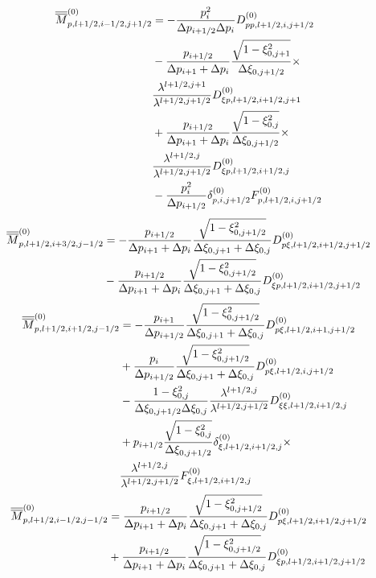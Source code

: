 \begin{align}
\overline{\overline{M}}_{p,l+1/2,i-1/2,j+1/2}^{\left( 0\right) } & =-\frac{%
p_{i}^{2}}{\Delta p_{i+1/2}\Delta p_{i}}D_{pp,l+1/2,i,j+1/2}^{\left(
0\right) }  \notag \\
& -\frac{p_{i+1/2}}{\Delta p_{i+1}+\Delta p_{i}}\frac{\sqrt{1-\xi_{0,j+1}^{2}%
}}{\Delta\xi_{0,j+1/2}}\times  \notag \\
& \frac{\lambda^{l+1/2,j+1}}{\lambda^{l+1/2,j+1/2}}D_{\xi
p,l+1/2,i+1/2,j+1}^{\left( 0\right) }  \notag \\
& +\frac{p_{i+1/2}}{\Delta p_{i+1}+\Delta p_{i}}\frac{\sqrt{1-\xi_{0,j}^{2}}%
}{\Delta\xi_{0,j+1/2}}\times  \notag \\
& \frac{\lambda^{l+1/2,j}}{\lambda^{l+1/2,j+1/2}}D_{\xi
p,l+1/2,i+1/2,j}^{\left( 0\right) }  \notag \\
& -\frac{p_{i}^{2}}{\Delta p_{i+1/2}}\delta_{p,i,j+1/2}^{\left( 0\right)
}F_{p,l+1/2,i,j+1/2}^{\left( 0\right) }
\end{align}
\begin{align}
\overline{\overline{M}}_{p,l+1/2,i+3/2,j-1/2}^{\left( 0\right) } & =-\frac{
p_{i+1/2}}{\Delta p_{i+1}+\Delta p_{i}}\frac{\sqrt{1-\xi_{0,j+1/2}^{2}}}{%
\Delta\xi_{0,j+1}+\Delta\xi_{0,j}}D_{p\xi,l+1/2,i+1/2,j+1/2}^{\left(
0\right) }  \notag \\
& -\frac{p_{i+1/2}}{\Delta p_{i+1}+\Delta p_{i}}\frac{\sqrt{1-\xi
_{0,j+1/2}^{2}}}{\Delta\xi_{0,j+1}+\Delta\xi_{0,j}}D_{\xi
p,l+1/2,i+1/2,j+1/2}^{\left( 0\right) }
\end{align}
\begin{align}
\overline{\overline{M}}_{p,l+1/2,i+1/2,j-1/2}^{\left( 0\right) } & =-\frac{%
p_{i+1}}{\Delta p_{i+1/2}}\frac{\sqrt{1-\xi_{0,j+1/2}^{2}}}{\Delta
\xi_{0,j+1}+\Delta\xi_{0,j}}D_{p\xi,l+1/2,i+1,j+1/2}^{\left( 0\right) } 
\notag \\
& +\frac{p_{i}}{\Delta p_{i+1/2}}\frac{\sqrt{1-\xi_{0,j+1/2}^{2}}}{\Delta
\xi_{0,j+1}+\Delta\xi_{0,j}}D_{p\xi,l+1/2,i,j+1/2}^{\left( 0\right) }  \notag
\\
& -\frac{1-\xi_{0,j}^{2}}{\Delta\xi_{0,j+1/2}\Delta\xi_{0,j}}\frac {%
\lambda^{l+1/2,j}}{\lambda^{l+1/2,j+1/2}}D_{\xi\xi,l+1/2,i+1/2,j}^{\left(
0\right) }  \notag \\
& +p_{i+1/2}\frac{\sqrt{1-\xi_{0,j}^{2}}}{\Delta\xi_{0,j+1/2}}\delta
_{\xi,l+1/2,i+1/2,j}^{\left( 0\right) }\times  \notag \\
& \frac{\lambda^{l+1/2,j}}{\lambda^{l+1/2,j+1/2}}F_{\xi,l+1/2,i+1/2,j}^{%
\left( 0\right) }
\end{align}
\begin{align}
\overline{\overline{M}}_{p,l+1/2,i-1/2,j-1/2}^{\left( 0\right) } & =\frac{%
p_{i+1/2}}{\Delta p_{i+1}+\Delta p_{i}}\frac{\sqrt{1-\xi_{0,j+1/2}^{2}}}{%
\Delta\xi_{0,j+1}+\Delta\xi_{0,j}}D_{p\xi,l+1/2,i+1/2,j+1/2}^{\left(
0\right) }  \notag \\
& +\frac{p_{i+1/2}}{\Delta p_{i+1}+\Delta p_{i}}\frac{\sqrt{1-\xi
_{0,j+1/2}^{2}}}{\Delta\xi_{0,j+1}+\Delta\xi_{0,j}}D_{\xi
p,l+1/2,i+1/2,j+1/2}^{\left( 0\right) }
\end{align}

